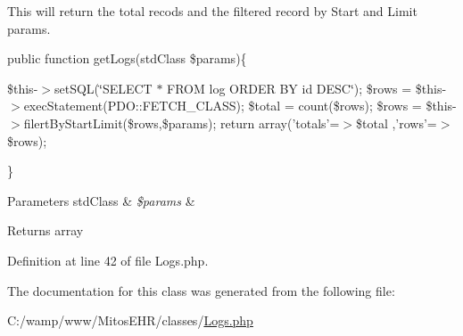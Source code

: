 \-This will return the total recods and the filtered record by \-Start and \-Limit params.

{\ttfamily  public function get\-Logs(std\-Class \$params)\{}

{\ttfamily  \$this-\/$>$set\-S\-Q\-L(\char`\"{}\-S\-E\-L\-E\-C\-T $\ast$ F\-R\-O\-M log O\-R\-D\-E\-R B\-Y id D\-E\-S\-C\char`\"{}); \$rows = \$this-\/$>$exec\-Statement(\-P\-D\-O\-::\-F\-E\-T\-C\-H\-\_\-\-C\-L\-A\-S\-S); \$total = count(\$rows); \$rows = \$this-\/$>$filert\-By\-Start\-Limit(\$rows,\$params); return array('totals'=$>$\$total ,'rows'=$>$\$rows);}

{\ttfamily  \} }


\begin{DoxyParams}[1]{\-Parameters}
std\-Class & {\em \$params} & \\
\hline
\end{DoxyParams}
\begin{DoxyReturn}{\-Returns}
array 
\end{DoxyReturn}


\-Definition at line 42 of file \-Logs.\-php.




\-The documentation for this class was generated from the following file\-:\begin{DoxyCompactItemize}
\item 
\-C\-:/wamp/www/\-Mitos\-E\-H\-R/classes/\hyperlink{_logs_8php}{\-Logs.\-php}\end{DoxyCompactItemize}

